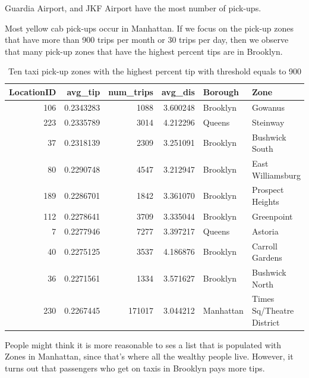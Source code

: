 \documentclass[12pt,twoside]{reedthesis}
\newenvironment{Shaded}{\begin{snugshade}}{\end{snugshade}}
\newcommand{\KeywordTok}[1]{\textcolor[rgb]{0.13,0.29,0.53}{\textbf{#1}}}
\newcommand{\DataTypeTok}[1]{\textcolor[rgb]{0.13,0.29,0.53}{#1}}
\newcommand{\DecValTok}[1]{\textcolor[rgb]{0.00,0.00,0.81}{#1}}
\newcommand{\StringTok}[1]{\textcolor[rgb]{0.31,0.60,0.02}{#1}}
\newcommand{\CommentTok}[1]{\textcolor[rgb]{0.56,0.35,0.01}{\textit{#1}}}
\newcommand{\OperatorTok}[1]{\textcolor[rgb]{0.81,0.36,0.00}{\textbf{#1}}}
\newcommand{\NormalTok}[1]{#1}
\theoremstyle{definition}
\theoremstyle{definition}
\theoremstyle{definition}
\theoremstyle{remark}
\begin{document}
Guardia Airport, and JKF Airport have the most number of pick-ups.

Most yellow cab pick-ups occur in Manhattan. If we focus on the pick-up
zones that have more than 900 trips per month or 30 trips per day, then
we observe that many pick-up zones that have the highest percent tips
are in Brooklyn.
\begin{Shaded}
\end{Shaded}
\begin{table}

\caption{\label{tab:unnamed-chunk-22}Ten taxi pick-up zones with the highest percent tip with threshold equals to 900}
\centering
\begin{tabular}[t]{r|r|r|r|l|l}
\hline
LocationID & avg\_tip & num\_trips & avg\_dis & Borough & Zone\\
\hline
106 & 0.2343283 & 1088 & 3.600248 & Brooklyn & Gowanus\\
\hline
223 & 0.2335789 & 3014 & 4.212296 & Queens & Steinway\\
\hline
37 & 0.2318139 & 2309 & 3.251091 & Brooklyn & Bushwick South\\
\hline
80 & 0.2290748 & 4547 & 3.212947 & Brooklyn & East Williamsburg\\
\hline
189 & 0.2286701 & 1842 & 3.361070 & Brooklyn & Prospect Heights\\
\hline
112 & 0.2278641 & 3709 & 3.335044 & Brooklyn & Greenpoint\\
\hline
7 & 0.2277946 & 7277 & 3.397217 & Queens & Astoria\\
\hline
40 & 0.2275125 & 3537 & 4.186876 & Brooklyn & Carroll Gardens\\
\hline
36 & 0.2271561 & 1334 & 3.571627 & Brooklyn & Bushwick North\\
\hline
230 & 0.2267445 & 171017 & 3.044212 & Manhattan & Times Sq/Theatre District\\
\hline
\end{tabular}
\end{table}
People might think it is more reasonable to ses a list that is populated
with Zones in Manhattan, since that's where all the wealthy people live.
However, it turns out that passengers who get on taxis in Brooklyn pays
more tips.
\end{document}
